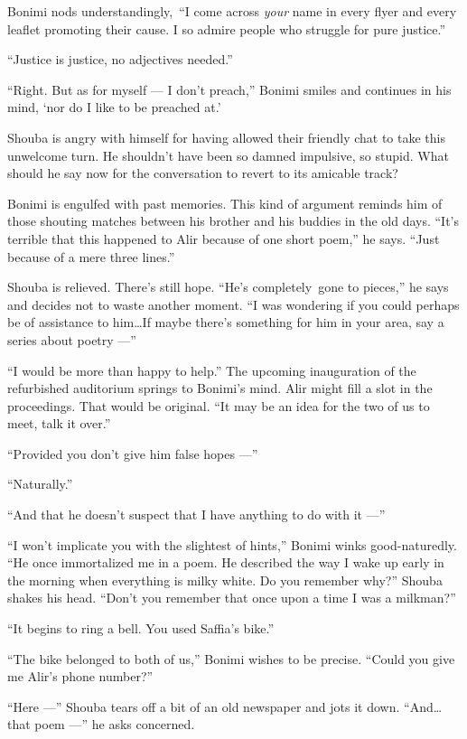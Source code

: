 \documentclass[twoside,11pt]{book}
\begin{document}
Bonimi nods understandingly,~``I come across \textit{your }name in every flyer and every leaflet promoting
their cause. I so admire people who struggle for pure justice.''

``Justice is justice, no adjectives needed.''

``Right. But as for myself --- I don't preach,'' Bonimi smiles and continues in his mind, `nor
do I like to be preached at.'

Shouba is angry with himself for having allowed their friendly chat to take this unwelcome turn. He shouldn't have been
so damned impulsive, so stupid. What should he say now for the conversation to revert to its amicable track?

Bonimi is engulfed with past memories. This kind of argument reminds him of those shouting matches between his brother
and his buddies in the old days. ``It's terrible that this happened to Alir because of one
short poem,''  he says. ``Just because of{ }{a }mere three lines.''

Shouba is relieved. There's still hope. ``He's completely~gone to pieces,'' he says and
decides not to waste another moment. ``I was wondering if you could perhaps be of assistance to
him{\ldots}If maybe there's something for him in your area, say a series about poetry ---''

``I would be more than happy to help.''  The upcoming inauguration of the refurbished
auditorium springs to Bonimi's mind. Alir might fill a slot in the proceedings. That would be original.
``It may be an idea for the two of us to meet, talk it over.''

``Provided you don't give him false hopes ---''

``Naturally.''

``And that he doesn't suspect that I have anything to do with it ---''

``I won't implicate you with the slightest of hints,'' Bonimi winks good-naturedly.
``He once immortalized me in a poem. He described the way I wake up early in the morning when everything
is milky white. Do you remember why?'' Shouba shakes his head. ``Don't you remember that once
upon a time I was a milkman?''

``It begins to ring a bell. You used Saffia's bike.''

``The bike belonged to both of us,'' Bonimi wishes to be precise. ``Could you
give me Alir's phone number?''

``Here ---'' Shouba tears off {a bit of an }old newspaper and jots it
down.  ``And{\ldots}that poem ---'' he asks concerned.
\end{document}
